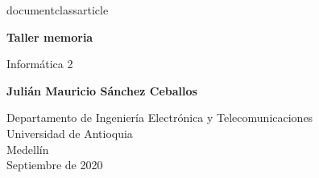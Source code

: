 documentclass{article}
\usepackage[utf8]{inputenc}
\usepackage[spanish]{babel}
\usepackage{listings}
\usepackage{graphicx}
\graphicspath{ {images/} }
\usepackage{cite}



\begin{titlepage}
    \begin{center}
        \vspace*{1cm}
            
        \Huge
        \textbf{Taller memoria}
            
        \vspace{0.5cm}
        \LARGE
        Informática 2
            
        \vspace{1.5cm}
            
        \textbf{Julián Mauricio Sánchez Ceballos}
            
        \vfill
            
        \vspace{0.8cm}
            
        \Large
        Departamento de Ingeniería Electrónica y Telecomunicaciones\\
        Universidad de Antioquia\\
        Medellín\\
        Septiembre de 2020
            
    \end{center}
\end{titlepage}
\tableofcontents

\newpage
